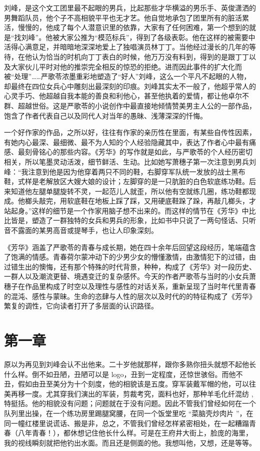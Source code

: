 \documentclass[12pt,twoside,openany]{book}
\begin{document}
刘峰，是这个文工团里最不起眼的男兵，比起那些才华横溢的男乐手、英俊潇洒的男舞蹈队员，他个子不高相貌平平也无才艺。他自觉地承包了团里所有的脏活累活，慢慢的，他成了每个人潜意识里的依靠，大家有了任何困难，第一个想到的就是“找刘峰”。他被大家公推为“模范标兵”，得到了各级表彰。他在这样的被需要中活得心满意足，并暗暗地深深地爱上了独唱演员林丁丁。当他经过漫长的几年的等待，在他认为恰当的时机向丁丁表白的时候，他万万没有料到，得到的是跟丁丁以及大家伙儿平时对他的推崇完全相反的惊恐的拒绝。进而因此事件的扩大化而被“处理”……严歌苓浓墨重彩地塑造了“好人”刘峰，这么一个平凡不起眼的人物，却最终在四位女兵心中雕刻出最深刻的印痕。刘峰其实太不一般了，他超乎常人的心灵手巧、他超越自我本能的善良和利他心，甚至他执着的爱情，都让他卓尔不群、超越世俗。这是严歌苓的小说创作中最直接地倾情赞美男主人公的一部作品，饱含了作者代表自己以及同代人对当年的愚昧、浅薄深深的忏悔。

一个好作家的作品，之所以好，往往有作家的亲历性在里面，有某些自传性因素，有她内心最深、最细微、最不为人知的个人经验隐藏其中，表达了作者心中最有痛感、最刻骨铭心的那些内容。《芳华》的写作就是如此，与严歌苓的个人经历密切相关，所以笔墨灵动活泼，细节鲜活、生动。比如她写萧穗子第一次注意到男兵刘峰：“我注意到他是因为他穿着两只不同的鞋，右脚穿军队统一发放的战士黑布鞋，式样是老解放区大嫂大娘的设计；左脚穿的是一只肮脏的白色软底练功鞋。后来知道他左腿单腿旋转不灵，一起范儿人就歪，所以他有空就练几圈，练功鞋都现成。他榔头敲完，用软底鞋在地板上踩了踩，又用硬底鞋跺了跺，再敲几榔头，才站起身。”这样的细节是一个作家用脑子想不出来的。而这样的情节在《芳华》中比比皆是，塑造了一群独特的女兵和男兵的形象，比如书中只说了一两句怪话、只听音不露面的某男高音或提琴手，也让人印象深刻。

《芳华》涵盖了严歌苓的青春与成长期，她在四十余年后回望这段经历，笔端蕴含了饱满的情感。青春荷尔蒙冲动下的少男少女的懵懂激情，由激情犯下的过错，由过错生出的懊悔，还有那个特殊的时代背景，种种，构成了《芳华》对一段历史、一群人以及潮流更替、境遇变迁的复杂感怀。今天的作者严歌苓与当时的小女兵萧穗子在作品里构成了时空以及理性与感性的对话关系，重新呈现了当时年代里青春的混沌、感性与蒙昧。生命的恣肆与人性的层次以及时代的的特征构成了《芳华》繁复的调性，它向读者打开了多层面的认识路径。

\chapter{第一章}

原以为再见到刘峰会认不出他来。二十岁他就那样，跟你多熟你扭头就想不起他长什么样。倒不如丑陋，丑陋可以是 logo，丑到一定程度，还惊世骇俗。而他不丑，假如由丑至美分为十个刻度，他的相貌该是五度。穿军装戴军帽的他，可以往美再移一度。尤其穿我们演出的军装，剪裁考究，面料也好，那种羊毛化纤混纺 ,特挺括。他的相貌没有问题；问题就在于没有问题。因此不管我们曾经如何在一个队列里出操，在一个练功房里踢腿窝腰，在同一个饭堂里吃 “菜脑壳炒肉片 ”，在同一幢红楼里说谎话、搬是非，总之，不管我们曾经怎样紧密相处，在一起糟蹋青春（八年青春！），都休想记住他长什么样。可是在王府井大街上，脸庞的海里，我的视线瞬刻就把他钓出水面。而且还是侧面的他。我想叫他，又想，还是等等。
\end{document}
